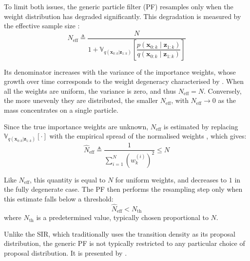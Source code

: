 To limit both issues, the generic particle filter (PF) \cite{bib:PF-Sarkka} resamples only when the weight distribution has degraded significantly. This degradation is measured by the effective sample size \cite{bib:sequential-imputations}:
\begin{equation}
	N_{\mathrm{eff}}\triangleq\frac{N}{1+\mathbb{V}_{q(\mathbf{x}_{0:k}|\mathbf{z}_{1:k})}\left[\dfrac{p(\mathbf{x}_{0:k}\mid\mathbf{z}_{1:k})}{q(\mathbf{x}_{0:k}\mid\mathbf{z}_{1:k})}\right]}
\end{equation}

Its denominator increases with the variance of the importance weights, whose growth over time corresponds to the weight degeneracy characterised by . When all the weights are uniform, the variance is zero, and thus $N_{\mathrm{eff}}=N$. Conversely, the more unevenly they are distributed, the smaller $N_{\mathrm{eff}}$, with $N_{\mathrm{eff}}\to0$ as the mass concentrates on a single particle.

Since the true importance weights are unknown, $N_{\mathrm{eff}}$ is estimated by replacing $\mathbb{V}_{q(\mathbf{x}_{0:k}|\mathbf{z}_{1:k})}[\cdot]$ with the empirical spread of the normalised weights \cite{bib:SMC-dynamic}, which gives:
\begin{equation}
	\hat{N}_{\mathrm{eff}}\triangleq\frac{1}{\displaystyle\sum_{i=1}^N\left(w_k^{(i)}\right)^2}\leq N
\end{equation}

Like $N_{\mathrm{eff}}$, this quantity is equal to $N$ for uniform weights, and decreases to $1$ in the fully degenerate case. The PF then performs the resampling step only when this estimate falls below a threshold:
\begin{equation}
	\hat{N}_{\mathrm{eff}}<N_{\mathrm{th}}
\end{equation}
where $N_{\mathrm{th}}$ is a predetermined value, typically chosen proportional to $N$.

Unlike the SIR, which traditionally uses the transition density as its proposal distribution, the generic PF is not typically restricted to any particular choice of proposal distribution. It is presented by .

